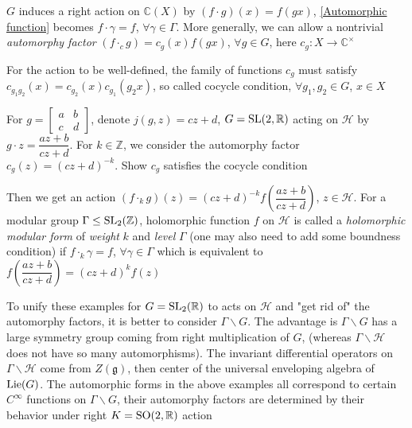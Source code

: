 \documentclass[main]{subfiles}
\begin{document}
\begin{definition}
$G$ induces a right action on $\mathbb C(X)$ by $(f\cdot g)(x)=f(gx)$, \eqref{Automorphic function} becomes $f\cdot \gamma=f$, $\forall \gamma\in\Gamma$. More generally, we can allow a nontrivial \textit{automorphy factor} $(f\cdot_cg)=c_g(x)f(gx)$, $\forall g\in G$, here $c_g:X\to\mathbb C^\times$
\end{definition}

\begin{exercise}
For the action to be well-defined, the family of functions $c_g$ must satisfy $c_{g_1g_2}(x)=c_{g_2}(x)c_{g_1}(g_2x)$, so called cocycle condition, $\forall g_1,g_2\in G$, $x\in X$
\end{exercise}

\begin{exercise}
For $g=\begin{bmatrix}
a&b\\
c&d
\end{bmatrix}$, denote $j(g,z)=cz+d$, $G=\operatorname{SL}(2,\mathbb R)$ acting on $\mathcal H$ by $g\cdot z=\dfrac{az+b}{cz+d}$. For $k\in\mathbb Z$, we consider the automorphy factor $c_g(z)=(cz+d)^{-k}$. Show $c_g$ satisfies the cocycle condition
\end{exercise}

\begin{definition}
Then we get an action $(f\cdot_kg)(z)=(cz+d)^{-k}f\left(\dfrac{az+b}{cz+d}\right)$, $z\in\mathcal H$. For a modular group $\Gamma\leq \operatorname{SL}_2(\mathbb Z)$, holomorphic function $f$ on $\mathcal H$ is called a \textit{holomorphic modular form} of \textit{weight} $k$ and \textit{level} $\Gamma$ (one may also need to add some boundness condition) if $f\cdot_k\gamma=f$, $\forall\gamma\in\Gamma$ which is equivalent to $f\left(\dfrac{az+b}{cz+d}\right)=(cz+d)^kf(z)$
\end{definition}

\begin{remark}
To unify these examples for $G=\operatorname{SL}_2(\mathbb R)$ to acts on $\mathcal H$ and "get rid of" the automorphy factors, it is better to consider $\Gamma\backslash G$. The advantage is $\Gamma\backslash G$ has a large symmetry group coming from right multiplication of $G$, (whereas $\Gamma\backslash\mathcal H$ does not have so many automorphisms). The invariant differential operators on $\Gamma\backslash\mathcal H$ come from $Z(\mathfrak g)$, then center of the universal enveloping algebra of $\operatorname{Lie}(G)$. The automorphic forms in the above examples all correspond to certain $C^\infty$ functions on $\Gamma\backslash G$, their automorphy factors are determined by their behavior under right $K=\operatorname{SO}(2,\mathbb R)$ action
\end{remark}
\end{document}
